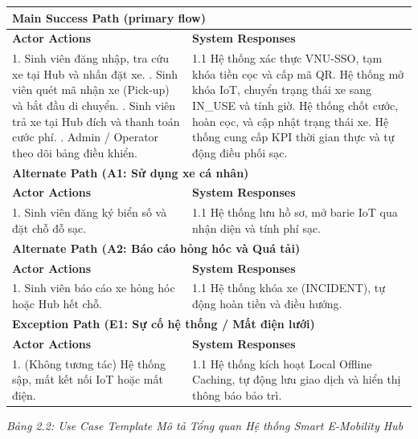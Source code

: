 \documentclass[12pt,a4paper]{report}
\begin{document}
\noindent\begin{tabularx}{\textwidth}{|X|X|}
\hline
\multicolumn{2}{|l|}{\textbf{Main Success Path (primary flow)}} \\
\hline
\textbf{Actor Actions} & \textbf{System Responses} \\
\hline
1. Sinh viên đăng nhập, tra cứu xe tại Hub và nhấn đặt xe. \newline
2. Sinh viên quét mã nhận xe (Pick-up) và bắt đầu di chuyển. \newline
3. Sinh viên trả xe tại Hub đích và thanh toán cước phí. \newline
4. Admin / Operator theo dõi bảng điều khiển. & 
1.1 Hệ thống xác thực VNU-SSO, tạm khóa tiền cọc và cấp mã QR. \newline
2.1 Hệ thống mở khóa IoT, chuyển trạng thái xe sang IN\_USE và tính giờ. \newline
3.1 Hệ thống chốt cước, hoàn cọc, và cập nhật trạng thái xe. \newline
4.1 Hệ thống cung cấp KPI thời gian thực và tự động điều phối sạc. \\
\hline
\multicolumn{2}{|l|}{\textbf{Alternate Path (A1: Sử dụng xe cá nhân)}} \\
\hline
\textbf{Actor Actions} & \textbf{System Responses} \\
\hline
1. Sinh viên đăng ký biển số và đặt chỗ đỗ sạc. & 1.1 Hệ thống lưu hồ sơ, mở barie IoT qua nhận diện và tính phí sạc. \\
\hline
\multicolumn{2}{|l|}{\textbf{Alternate Path (A2: Báo cáo hỏng hóc và Quá tải)}} \\
\hline
\textbf{Actor Actions} & \textbf{System Responses} \\
\hline
1. Sinh viên báo cáo xe hỏng hóc hoặc Hub hết chỗ. & 1.1 Hệ thống khóa xe (INCIDENT), tự động hoàn tiền và điều hướng. \\
\hline
\multicolumn{2}{|l|}{\textbf{Exception Path (E1: Sự cố hệ thống / Mất điện lưới)}} \\
\hline
\textbf{Actor Actions} & \textbf{System Responses} \\
\hline
1. (Không tương tác) Hệ thống sập, mất kết nối IoT hoặc mất điện. & 1.1 Hệ thống kích hoạt Local Offline Caching, tự động lưu giao dịch và hiển thị thông báo bảo trì. \\
\hline
\end{tabularx}
\begin{center}\textit{Bảng 2.2: Use Case Template Mô tả Tổng quan Hệ thống Smart E-Mobility Hub}\end{center}
\vspace{0.5cm}
\end{document}
